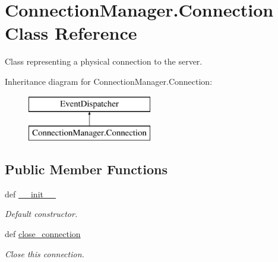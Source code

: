 \hypertarget{class_connection_manager_1_1_connection}{\section{Connection\-Manager.\-Connection Class Reference}
\label{class_connection_manager_1_1_connection}
}


Class representing a physical connection to the server.  


Inheritance diagram for Connection\-Manager.\-Connection\-:\begin{figure}[H]
\begin{center}
\leavevmode
\includegraphics[height=2.000000cm]{class_connection_manager_1_1_connection}
\end{center}
\end{figure}
\subsection*{Public Member Functions}
\begin{DoxyCompactItemize}
\item 
def \hyperlink{class_connection_manager_1_1_connection_aed48556114c40be29ee0368b0aae32ac}{\-\_\-\-\_\-init\-\_\-\-\_\-}
\begin{DoxyCompactList}\small\item\em Default constructor. \end{DoxyCompactList}\item 
def \hyperlink{class_connection_manager_1_1_connection_a9b2e60752c684646830f8ce9923ee66e}{close\-\_\-connection}
\begin{DoxyCompactList}\small\item\em Close this connection. \end{DoxyCompactList}\end{DoxyCompactItemize}
